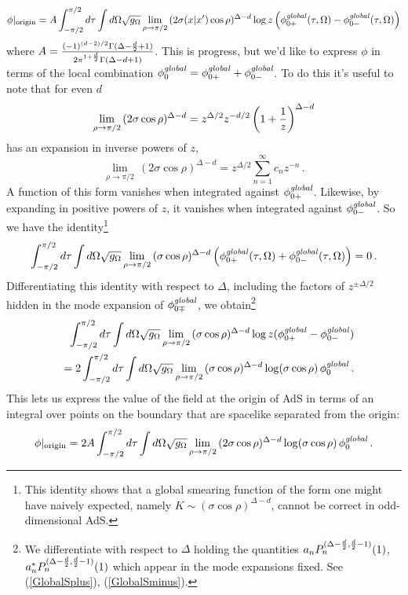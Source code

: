 \documentclass[12pt]{article}
\newcommand{\phinotg} [1]{{\phi_{0#1}^{\it global}}}
\begin{document}
\begin{equation}
\phi \vert_{\rm origin} = A \int_{-\pi/2}^{\pi/2} d\tau \int d\Omega \sqrt{g_\Omega} \lim_{\rho \rightarrow \pi/2} \,
(2 \sigma(x \vert x') \cos \rho)^{\Delta - d} \log z \left(\phinotg{+}(\tau,\Omega) - \phinotg{-}(\tau,\Omega)\right)
\end{equation}
where $A = {(-1)^{(d - 2)/2} \Gamma(\Delta - {d \over 2} + 1) \over 2 \pi^{1 + {d \over 2}} \Gamma(\Delta - d + 1)}$.
This is progress, but we'd like to express $\phi$ in terms of the local combination $\phinotg{} = \phinotg{+} + \phinotg{-}$.
To do this it's useful to note that for even $d$
\begin{equation}
\lim_{\rho \rightarrow \pi/2} \, (2 \sigma \cos \rho)^{\Delta - d} = z^{\Delta / 2} z^{-d/2} \left(1 + {1 \over z}\right)^{\Delta - d}
\end{equation}
has an expansion in inverse powers of $z$,
\begin{equation}
\label{EvenIdentity}
\lim_{\rho \rightarrow \pi/2} \, (2 \sigma \cos \rho)^{\Delta - d} = z^{\Delta / 2} \sum_{n = 1}^\infty c_n z^{-n}\,.
\end{equation}
A function of this form vanishes when integrated against $\phinotg{+}$.  Likewise, by expanding in positive
powers of $z$, it vanishes when integrated against $\phinotg{-}$.  So we have the identity\footnote{This identity
shows that a global smearing function of the form one might have naively expected, namely $K \sim
(\sigma\cos\rho)^{\Delta - d}$, cannot be correct in odd-dimensional AdS.}
\begin{equation} \label{zisz}
\int_{-\pi/2}^{\pi/2} d\tau \int d\Omega \sqrt{g_\Omega} \lim_{\rho \rightarrow \pi/2} \, (\sigma \cos \rho)^{\Delta - d}
\left(\phinotg{+}(\tau,\Omega) + \phinotg{-}(\tau,\Omega)\right) = 0\,.
\end{equation}
Differentiating this identity with respect to $\Delta$, including the factors of $z^{\pm \Delta/2}$ hidden in the
mode expansion of $\phinotg{\mp}$, we obtain\footnote{We differentiate with respect to $\Delta$ holding the quantities
$a_n P_n^{(\Delta - {d \over 2},{d \over 2} - 1)}(1)$, $a_n^* P_n^{(\Delta - {d \over 2},{d \over 2} - 1)}(1)$ which
appear in the mode expansions fixed.  See (\ref{GlobalSplus}), (\ref{GlobalSminus}).}
\begin{eqnarray}
\nonumber
&& \int_{-\pi/2}^{\pi/2} d\tau \int d\Omega \sqrt{g_\Omega} \lim_{\rho \rightarrow \pi/2} \,
(\sigma \cos \rho)^{\Delta - d} \log z (\phinotg{+} - \phinotg{-}) \\
&& = 2 \int_{-\pi/2}^{\pi/2} d\tau \int d\Omega \sqrt{g_\Omega} \lim_{\rho \rightarrow \pi/2} \,
(\sigma \cos \rho)^{\Delta - d} \log (\sigma \cos \rho) \, \phinotg{}\,.
\end{eqnarray}
This lets us express the value of the field at the origin of AdS in terms of an integral over points on the
boundary that are spacelike separated from the origin:
\begin{equation}
\label{origin}
\phi \vert_{\rm origin} = 2A \int_{-\pi/2}^{\pi/2} d\tau \int d\Omega \sqrt{g_\Omega} \lim_{\rho \rightarrow \pi/2} \,
(2 \sigma \cos \rho)^{\Delta - d} \log (\sigma \cos \rho) \, \phinotg{}\,.
\end{equation}
\end{document}
